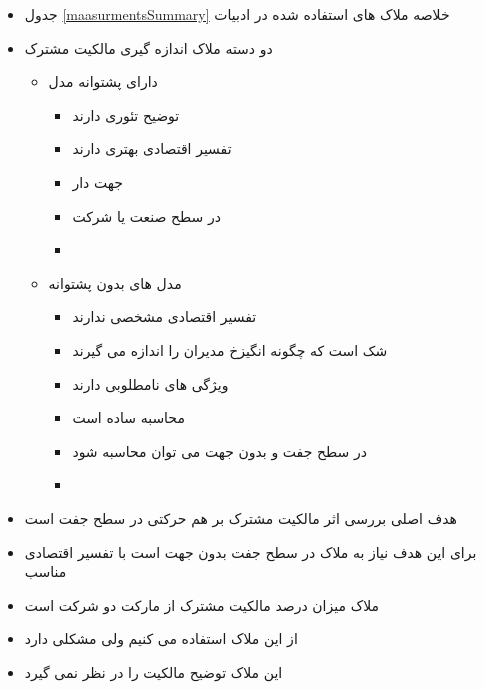 \documentclass[12pt, a4paper]{article}
\begin{document}
\begin{itemize}
	\item 
	جدول 
	\ref{maasurmentsSummary}
	خلاصه ملاک های استفاده شده در ادبیات
	\item 
	دو دسته ملاک اندازه گیری مالکیت مشترک
	\begin{itemize}
		\item 
		دارای پشتوانه مدل
		\begin{itemize}
			\item 
			توضیح تئوری دارند
			\item 
			تفسیر اقتصادی بهتری دارند
			\item 
			جهت دار
			\item
			در سطح صنعت یا شرکت
			\item
		\end{itemize}
		\item 
	مدل های بدون پشتوانه
	\begin{itemize}
		\item 
		تفسیر اقتصادی مشخصی ندارند
		\item 
		شک است که چگونه انگیزخ مدیران را اندازه می گیرند
		\item 
		ویژگی های نامطلوبی دارند 
		\item
		محاسبه ساده است
		\item
		در سطح جفت و بدون جهت می توان محاسبه شود
		
		\item
	\end{itemize}
	
		
	\end{itemize}
	
	\item 
	هدف اصلی بررسی اثر مالکیت مشترک بر هم حرکتی در سطح جفت است
	
	\item 
	برای این هدف نیاز به ملاک در سطح جفت بدون جهت است با تفسیر اقتصادی مناسب
	
	\item 
	ملاک
	\cite{AntonPolk}
	میزان درصد مالکیت مشترک از مارکت دو شرکت است
	
	
	\item 
	از این ملاک استفاده می کنیم ولی مشکلی دارد
	\item 
	این ملاک توضیح مالکیت را در نظر نمی گیرد
	
\end{itemize}
\end{document}
